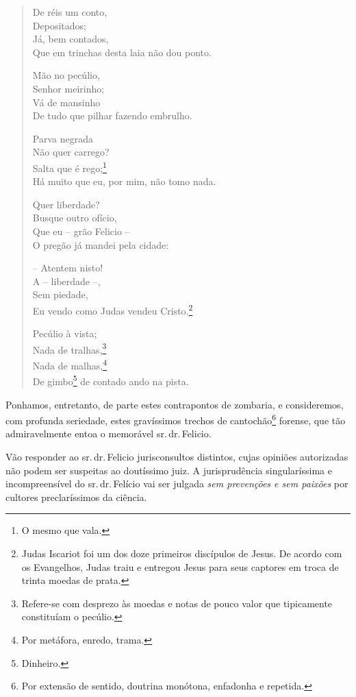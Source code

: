 \begin{verse}
De réis um conto,\\
Depositados;\\
Já, bem contados,\\
Que em trinchas desta laia não dou ponto.

Mão no pecúlio,\\
Senhor meirinho;\\
Vá de mansinho\\
De tudo que pilhar fazendo embrulho.

Parva negrada\\
Não quer carrego?\\
Salta que é rego;\footnote{ O mesmo que vala.}\\
Há muito que eu, por mim, não tomo nada.

Quer liberdade?\\
Busque outro ofício,\\
Que eu -- grão Felicio --\\
O pregão já mandei pela cidade:

-- Atentem nisto!\\
A -- liberdade --,\\
Sem piedade,\\
Eu vendo como Judas vendeu Cristo.\footnote{ Judas Iscariot foi um dos
  doze primeiros discípulos de Jesus. De acordo com os Evangelhos, Judas
  traiu e entregou Jesus para seus captores em troca de trinta moedas de
  prata.}

Pecúlio à vista;\\
Nada de tralhas,\footnote{Refere-se com desprezo às moedas e notas de
  pouco valor que tipicamente constituíam o pecúlio.}\\
Nada de malhas,\footnote{ Por metáfora, enredo, trama.}\\
De gimbo\footnote{Dinheiro.} de contado ando na pista.
\end{verse}

Ponhamos, entretanto, de parte estes contrapontos de zombaria, e
consideremos, com profunda seriedade, estes gravíssimos trechos de
cantochão\footnote{ Por extensão de sentido, doutrina monótona,
  enfadonha e repetida.} forense, que tão admiravelmente entoa o
memorável sr.\,dr.\,Felicio.

\asterisc

Vão responder ao sr.\,dr.\,Felicio jurisconsultos distintos, cujas
opiniões autorizadas não podem ser suspeitas ao doutíssimo juiz. A
jurisprudência singularíssima e incompreensível do sr.\,dr.\,Felício vai
ser julgada \emph{sem prevenções e sem paixões} por cultores
preclaríssimos da ciência.

